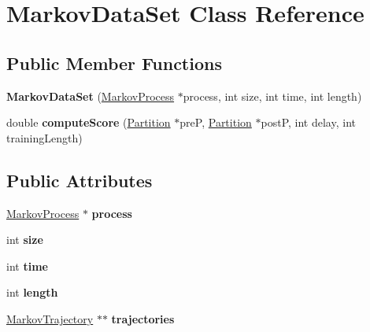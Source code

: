 \hypertarget{class_markov_data_set}{\section{Markov\-Data\-Set Class Reference}
\label{class_markov_data_set}
}
\subsection*{Public Member Functions}
\begin{DoxyCompactItemize}
\item 
\hypertarget{class_markov_data_set_af5652def3bd861e32423628515212e1a}{{\bfseries Markov\-Data\-Set} (\hyperlink{class_markov_process}{Markov\-Process} $\ast$process, int size, int time, int length)}\label{class_markov_data_set_af5652def3bd861e32423628515212e1a}

\item 
\hypertarget{class_markov_data_set_a90e28188b58acc59d75d44e01022e180}{double {\bfseries compute\-Score} (\hyperlink{class_partition}{Partition} $\ast$pre\-P, \hyperlink{class_partition}{Partition} $\ast$post\-P, int delay, int training\-Length)}\label{class_markov_data_set_a90e28188b58acc59d75d44e01022e180}

\end{DoxyCompactItemize}
\subsection*{Public Attributes}
\begin{DoxyCompactItemize}
\item 
\hypertarget{class_markov_data_set_a4634e9ebbab3500e07fc039b7917c219}{\hyperlink{class_markov_process}{Markov\-Process} $\ast$ {\bfseries process}}\label{class_markov_data_set_a4634e9ebbab3500e07fc039b7917c219}

\item 
\hypertarget{class_markov_data_set_ad00c1b3025f6fcbd67e7c23b456962bd}{int {\bfseries size}}\label{class_markov_data_set_ad00c1b3025f6fcbd67e7c23b456962bd}

\item 
\hypertarget{class_markov_data_set_a5ac0cfb2d1cbe80c7f4e6c980c93dcdd}{int {\bfseries time}}\label{class_markov_data_set_a5ac0cfb2d1cbe80c7f4e6c980c93dcdd}

\item 
\hypertarget{class_markov_data_set_a4506dddc00f33e4e889a5de277bd2966}{int {\bfseries length}}\label{class_markov_data_set_a4506dddc00f33e4e889a5de277bd2966}

\item 
\hypertarget{class_markov_data_set_aee1a6c899637e2c9cc3c22977b17f7b2}{\hyperlink{class_markov_trajectory}{Markov\-Trajectory} $\ast$$\ast$ {\bfseries trajectories}}\label{class_markov_data_set_aee1a6c899637e2c9cc3c22977b17f7b2}

\end{DoxyCompactItemize}


